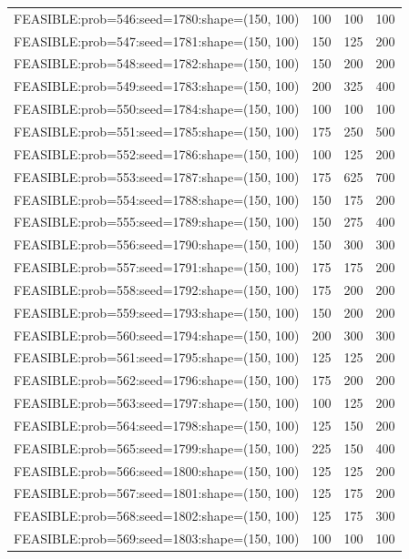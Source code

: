 \begin{longtable}{lccc}
FEASIBLE:prob=546:seed=1780:shape=(150, 100) &  100 &   100 &    100 \\
FEASIBLE:prob=547:seed=1781:shape=(150, 100) &  150 &   125 &    200 \\
FEASIBLE:prob=548:seed=1782:shape=(150, 100) &  150 &   200 &    200 \\
FEASIBLE:prob=549:seed=1783:shape=(150, 100) &  200 &   325 &    400 \\
FEASIBLE:prob=550:seed=1784:shape=(150, 100) &  100 &   100 &    100 \\
FEASIBLE:prob=551:seed=1785:shape=(150, 100) &  175 &   250 &    500 \\
FEASIBLE:prob=552:seed=1786:shape=(150, 100) &  100 &   125 &    200 \\
FEASIBLE:prob=553:seed=1787:shape=(150, 100) &  175 &   625 &    700 \\
FEASIBLE:prob=554:seed=1788:shape=(150, 100) &  150 &   175 &    200 \\
FEASIBLE:prob=555:seed=1789:shape=(150, 100) &  150 &   275 &    400 \\
FEASIBLE:prob=556:seed=1790:shape=(150, 100) &  150 &   300 &    300 \\
FEASIBLE:prob=557:seed=1791:shape=(150, 100) &  175 &   175 &    200 \\
FEASIBLE:prob=558:seed=1792:shape=(150, 100) &  175 &   200 &    200 \\
FEASIBLE:prob=559:seed=1793:shape=(150, 100) &  150 &   200 &    200 \\
FEASIBLE:prob=560:seed=1794:shape=(150, 100) &  200 &   300 &    300 \\
FEASIBLE:prob=561:seed=1795:shape=(150, 100) &  125 &   125 &    200 \\
FEASIBLE:prob=562:seed=1796:shape=(150, 100) &  175 &   200 &    200 \\
FEASIBLE:prob=563:seed=1797:shape=(150, 100) &  100 &   125 &    200 \\
FEASIBLE:prob=564:seed=1798:shape=(150, 100) &  125 &   150 &    200 \\
FEASIBLE:prob=565:seed=1799:shape=(150, 100) &  225 &   150 &    400 \\
FEASIBLE:prob=566:seed=1800:shape=(150, 100) &  125 &   125 &    200 \\
FEASIBLE:prob=567:seed=1801:shape=(150, 100) &  125 &   175 &    200 \\
FEASIBLE:prob=568:seed=1802:shape=(150, 100) &  125 &   175 &    300 \\
FEASIBLE:prob=569:seed=1803:shape=(150, 100) &  100 &   100 &    100 \\

\end{longtable}

